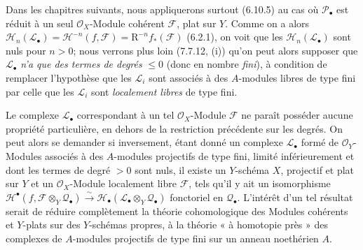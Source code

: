 \begin{remark}[6.10.6]
Dans les chapitres suivants, nous appliquerons surtout (6.10.5) au cas où
$\mathscr P_\bullet$ est réduit à un seul $\mathscr O_X$-Module cohérent
$\mathscr F$, plat sur $Y$. Comme on a alors
$\mathscr H_n(\mathscr L_\bullet)=\mathscr H^{-n}(f,\mathscr F)=\mathrm R^{-n}f_*(\mathscr F)$ (6.2.1),
on voit que les $\mathscr H_n(\mathscr L_\bullet)$ sont nuls pour $n>0$;
nous verrons plus loin (7.7.12, (i)) qu'on peut alors supposer que
$\mathscr L_\bullet$ \emph{n'a que des termes de degrés} $\leqslant0$ (donc en
nombre \emph{fini}), à condition de remplacer l'hypothèse que les $\mathscr L_i$
sont associés à des $A$-modules libres de type fini par celle que les
$\mathscr L_i$ sont \emph{localement libres} de type fini.

Le complexe $\mathscr L_\bullet$ correspondant à un tel
$\mathscr O_X$-Module $\mathscr F$ ne paraît posséder aucune
propriété particulière, en dehors de la restriction précédente sur les
degrés. On peut alors se demander si inversement, étant donné un complexe
$\mathscr L_\bullet$ formé de $\mathscr O_Y$-Modules associés à des
$A$-modules projectifs de type fini, limité inférieurement et dont les termes
de degré $>0$ sont nuls, il existe un $Y$-schéma $X$, projectif et plat sur
$Y$ et un $\mathscr O_X$-Module localement libre $\mathscr F$, tels qu'il y
ait un isomorphisme $\mathscr H^\bullet(f,\mathscr F\otimes_Y\mathscr Q_\bullet)\xrightarrow{\sim}\mathscr H_\bullet(\mathscr L_\bullet\otimes_Y\mathscr Q_\bullet)$
fonctoriel en $\mathscr Q_\bullet$. L'intérêt d'un tel résultat serait de
réduire complètement la théorie cohomologique des Modules cohérents et
$Y$-plats sur des $Y$-schémas propres, à la théorie « à homotopie près » des
complexes de $A$-modules projectifs de type fini sur un anneau noethérien
$A$.
\end{remark}

